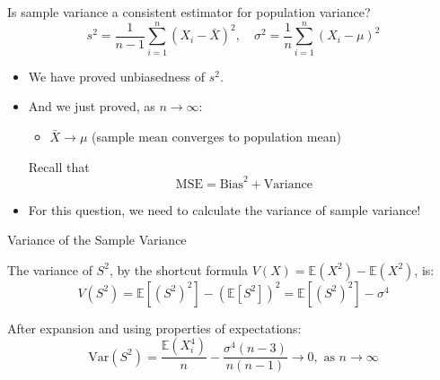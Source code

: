 \documentclass[12pt]{beamer}
\newcommand{\E}{\mathbb{E}}
\begin{document}
\begin{frame}{Is sample variance a consistent estimator for population variance?}
	$$s^2= \frac{1}{n-1} \sum_{i=1}^n (X_i - \bar{X})^2,\quad\sigma^2=\frac{1}{n} \sum_{i=1}^n(X_i-\mu)^2$$
	\begin{itemize}[label={\color{blue}$\blacktriangleright$}]
		\item We have proved unbiasedness of $s^2$.
		\item And we just proved, as $n \to \infty$:
		\begin{itemize}[label={\color{blue}$\blacktriangleright$}]
			\item $\bar{X} \to \mu$ (sample mean converges to population mean)
		\end{itemize}
		Recall that
		\begin{equation*}
			\text{MSE} = \text{Bias}^2 + \text{Variance}
		\end{equation*}
		\item For this question, we need to calculate the variance of sample variance!
	\end{itemize}
\end{frame}


\begin{frame}{Variance of the Sample Variance}
	
	The variance of \( S^2 \), by the shortcut formula $V(X)=\E(X^2)-\E(X^2)$, is:
	$$V(S^2) = \mathbb{E}[(S^2)^2] - (\mathbb{E}[S^2])^2= \mathbb{E}[(S^2)^2]-\sigma^4$$
	
	After expansion and using properties of expectations:
	\begin{equation*}
		\text{Var}(S^2) = \frac{\E(X_i^4)}{n}-\frac{\sigma^4(n-3)}{n(n-1)}\to0,\text{ as }n\to\infty 
	\end{equation*}
	
\end{frame}
\end{document}
